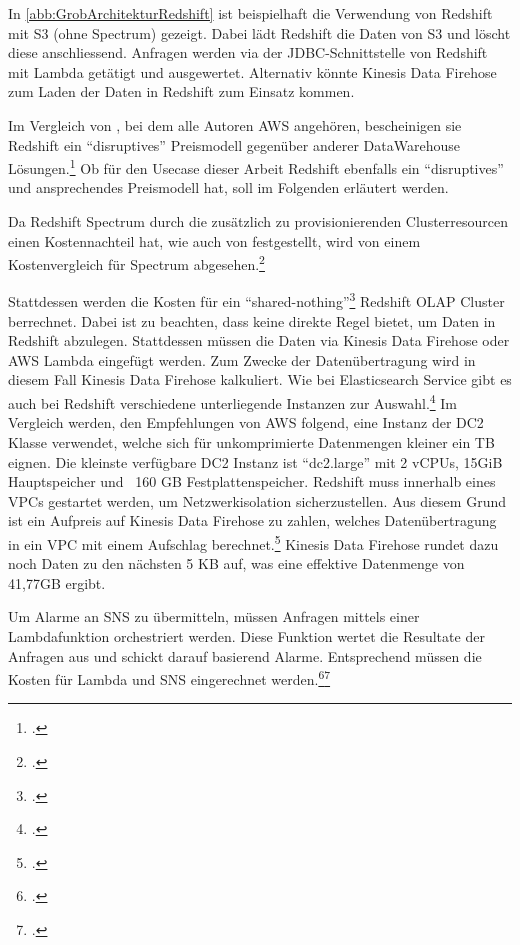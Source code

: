 In \autoref{abb:GrobArchitekturRedshift} ist beispielhaft die Verwendung von Redshift mit \ac{S3} (ohne Spectrum) gezeigt. Dabei lädt Redshift die Daten von \ac{S3} und löscht diese anschliessend. Anfragen werden via der \ac{JDBC}-Schnittstelle von Redshift mit Lambda getätigt und ausgewertet. Alternativ könnte Kinesis Data Firehose zum Laden der Daten in Redshift zum Einsatz kommen.


Im Vergleich von \citeauthor{Gupta.2015}, bei dem alle Autoren \ac{AWS} angehören, bescheinigen sie Redshift ein \enquote{disruptives} Preismodell gegenüber anderer DataWarehouse Lösungen.\footcite[Vgl.][]{Gupta.2015} Ob für den Usecase dieser Arbeit Redshift ebenfalls ein \enquote{disruptives} und ansprechendes Preismodell hat, soll im Folgenden erläutert werden.

Da Redshift Spectrum durch die zusätzlich zu provisionierenden Clusterresourcen einen Kostennachteil hat, wie auch von \citeauthor{Tan.2019} festgestellt, wird von einem Kostenvergleich für Spectrum abgesehen.\footcite[Vgl.][2178]{Tan.2019}

Stattdessen werden die Kosten für ein \enquote{shared-nothing}\footcite[Vgl.][2172]{Tan.2019} Redshift \ac{OLAP} Cluster berrechnet. Dabei ist zu beachten, dass \AWSIOT{} keine direkte Regel bietet, um Daten in Redshift abzulegen. Stattdessen müssen die Daten via Kinesis Data Firehose oder \ac{AWS} Lambda eingefügt werden. Zum Zwecke der Datenübertragung wird in diesem Fall Kinesis Data Firehose kalkuliert. Wie bei Elasticsearch Service gibt es auch bei Redshift verschiedene unterliegende Instanzen zur Auswahl.\footcite[Vgl. auch im Folgenden][]{AmazonWebServicesInc..o.J.z} Im Vergleich werden, den Empfehlungen von \ac{AWS} folgend, eine Instanz der \ac{DC2} Klasse verwendet, welche sich für unkomprimierte Datenmengen kleiner ein TB eignen. Die kleinste verfügbare \ac{DC2} Instanz ist \enquote{dc2.large} mit 2 vCPUs, 15GiB Hauptspeicher und ~160 GB Festplattenspeicher. Redshift muss innerhalb eines \acp{VPC} gestartet werden, um Netzwerkisolation sicherzustellen. Aus diesem Grund ist ein Aufpreis auf Kinesis Data Firehose zu zahlen, welches Datenübertragung in ein \ac{VPC} mit einem Aufschlag berechnet.\footcite[Vgl. auch im Folgenden][]{AmazonWebServicesInc..o.J.y} Kinesis Data Firehose rundet dazu noch Daten zu den nächsten 5 KB auf, was eine effektive Datenmenge von 41,77GB ergibt.

Um Alarme an \ac{SNS} zu übermitteln, müssen Anfragen mittels einer Lambdafunktion orchestriert werden. Diese Funktion wertet die Resultate der Anfragen aus und schickt darauf basierend Alarme. Entsprechend müssen die Kosten für Lambda und \ac{SNS} eingerechnet werden.\footcite[Vgl.][]{AmazonWebServicesInc..o.J.bx}\nzitat\footcite[Vgl.][]{AmazonWebServicesInc..o.J.by}

